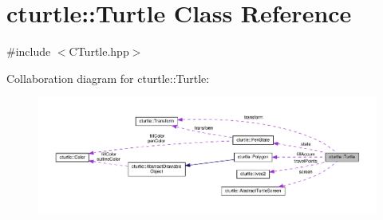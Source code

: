 \hypertarget{classcturtle_1_1Turtle}{}\section{cturtle\+:\+:Turtle Class Reference}
\label{classcturtle_1_1Turtle}


{\ttfamily \#include $<$C\+Turtle.\+hpp$>$}



Collaboration diagram for cturtle\+:\+:Turtle\+:\nopagebreak
\begin{figure}[H]
\begin{center}
\leavevmode
\includegraphics[width=350pt]{classcturtle_1_1Turtle__coll__graph}
\end{center}
\end{figure}

